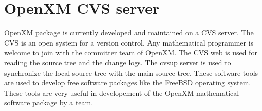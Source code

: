 
\section{OpenXM CVS server}  

OpenXM package is currently developed and maintained on
a CVS server.
The CVS is an open system for a version control.
Any mathematical programmer is welcome to
join with the committer team of OpenXM.
The CVS web is used for reading the source tree and the change logs.
The cvsup server is used to synchronize the local source tree with
the main source tree.
These software tools are used to develop free software packages
like the FreeBSD operating system.
These tools are very useful in developement
of the OpenXM mathematical software package by a team.
